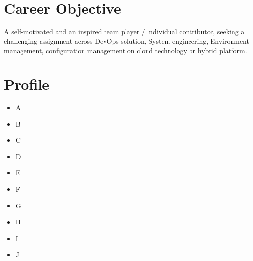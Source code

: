 \documentclass[]{cv-style} %
\begin{document}
\section{Career Objective}
 \vspace{-0.3cm}
A self-motivated and an inspired team player / individual contributor, seeking a challenging assignment across DevOps solution, System engineering, Environment management, configuration management on cloud technology or hybrid platform.
\section{Profile}
\begin{itemize}
\item A 
\item B
\item C
\item D
\item E
\item F
\item G
\item H
\item I
\item J
\end{itemize}
\end{document}

